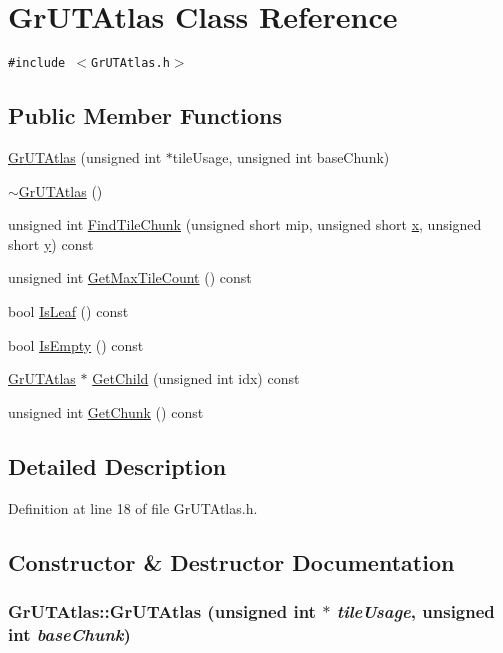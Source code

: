 \hypertarget{class_gr_u_t_atlas}{
\section{GrUTAtlas Class Reference}
\label{class_gr_u_t_atlas}
}
{\tt \#include $<$GrUTAtlas.h$>$}

\subsection*{Public Member Functions}
\begin{CompactItemize}
\item 
\hyperlink{class_gr_u_t_atlas_1d95d0535c6495a3f9f680815ec35d38}{GrUTAtlas} (unsigned int $\ast$tileUsage, unsigned int baseChunk)
\item 
\hyperlink{class_gr_u_t_atlas_2f3072b511b4c916631ff4f2dbb4bd57}{$\sim$GrUTAtlas} ()
\item 
unsigned int \hyperlink{class_gr_u_t_atlas_44541528b8f270d2f59d9a89c8d0a331}{FindTileChunk} (unsigned short mip, unsigned short \hyperlink{wglext_8h_d77deca22f617d3f0e0eb786445689fc}{x}, unsigned short \hyperlink{wglext_8h_9298c7ad619074f5285b32c6b72bfdea}{y}) const 
\item 
unsigned int \hyperlink{class_gr_u_t_atlas_0600996694ae669b3e661b03e48ed002}{GetMaxTileCount} () const 
\item 
bool \hyperlink{class_gr_u_t_atlas_51707ae21d8a5b2d4349b23ba4209651}{IsLeaf} () const 
\item 
bool \hyperlink{class_gr_u_t_atlas_b2181198f45b057ad3776187e11b6bfe}{IsEmpty} () const 
\item 
\hyperlink{class_gr_u_t_atlas}{GrUTAtlas} $\ast$ \hyperlink{class_gr_u_t_atlas_ac1053adb8f881c4db9bce7d0ee185d4}{GetChild} (unsigned int idx) const 
\item 
unsigned int \hyperlink{class_gr_u_t_atlas_8cdc84f1ac50f1d3b2e6f9bc889e9c15}{GetChunk} () const 
\end{CompactItemize}


\subsection{Detailed Description}


Definition at line 18 of file GrUTAtlas.h.

\subsection{Constructor \& Destructor Documentation}
\hypertarget{class_gr_u_t_atlas_1d95d0535c6495a3f9f680815ec35d38}{
\subsubsection[{GrUTAtlas}]{\setlength{\rightskip}{0pt plus 5cm}GrUTAtlas::GrUTAtlas (unsigned int $\ast$ {\em tileUsage}, \/  unsigned int {\em baseChunk})}}
\label{class_gr_u_t_atlas_1d95d0535c6495a3f9f680815ec35d38}




